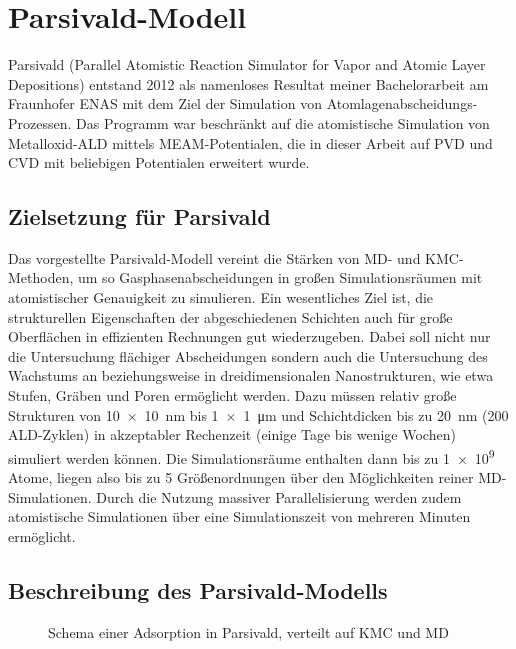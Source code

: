 \section{Parsivald-Modell}
\label{parsivald}

Parsivald (Parallel Atomistic Reaction Simulator for Vapor and Atomic Layer Depositions) entstand 2012 als namenloses Resultat meiner Bachelorarbeit\cite{lorenz_entwicklung_2012} am Fraunhofer ENAS mit dem Ziel der Simulation von Atom\-lagen\-abscheidungs-Prozessen.
Das Programm war beschränkt auf die atomistische Simulation von Metall\-oxid-ALD mittels MEAM-Potentialen, die in dieser Arbeit auf PVD und CVD mit beliebigen Potentialen erweitert wurde.

\subsection{Zielsetzung für Parsivald}

Das vorgestellte Parsivald-Modell vereint die Stärken von MD- und KMC-Methoden, um so Gasphasenabscheidungen in großen Simulationsräumen mit atomistischer Genauigkeit zu simulieren.
Ein wesentliches Ziel ist, die strukturellen Eigenschaften der abgeschiedenen Schichten auch für große Oberflächen in effizienten Rechnungen gut wiederzugeben.
Dabei soll nicht nur die Untersuchung flächiger Abscheidungen sondern auch die Untersuchung des Wachstums an beziehungsweise in dreidimensionalen Nanostrukturen, wie etwa Stufen, Gräben und Poren ermöglicht werden.
Dazu müssen relativ große Strukturen von \SI{10x10}{\nano\meter} bis \SI{1x1}{\micro\meter} und Schichtdicken bis zu \SI{20}{\nano\meter} (\num{200} ALD-Zyklen) in akzeptabler Rechenzeit (einige Tage bis wenige Wochen) simuliert werden können.
Die Simulationsräume enthalten dann bis zu \num{1e9} Atome, liegen also bis zu \num{5} Größenordnungen über den Möglichkeiten reiner MD-Simulationen.
Durch die Nutzung massiver Parallelisierung werden zudem atomistische Simulationen über eine Simulationszeit von mehreren Minuten ermöglicht.

\subsection{Beschreibung des Parsivald-Modells}

\begin{figure}[b]
  \centering
  \def\svgwidth{\textwidth}
  
  \caption[Schema einer Adsorption in Parsivald]{Schema einer Adsorption in Parsivald, verteilt auf KMC und MD}
  \label{fig:parsivald-schema}
\end{figure}

